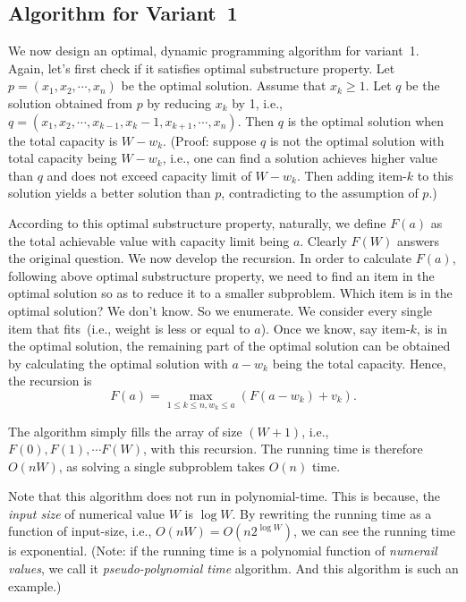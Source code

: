 \documentclass[letterpaper,11pt]{article}
\theoremstyle{mytheorem}
\begin{document}
\subsection*{Algorithm for Variant~1}

We now design an optimal, dynamic programming algorithm for variant~1.
Again, let's first check if it satisfies optimal substructure property.
Let $p = (x_1, x_2, \cdots, x_n)$ be the optimal solution.
Assume that $x_k \ge 1$. Let $q$ be the solution obtained from $p$ by
reducing $x_k$ by 1, i.e., $q = (x_1, x_2, \cdots, x_{k-1}, x_k - 1, x_{k + 1}, \cdots, x_n)$.
Then $q$ is the optimal solution when the total capacity is $W - w_k$.
(Proof: suppose $q$ is not the optimal solution with total capacity being $W - w_k$,
i.e., one can find a solution achieves higher value than $q$ and does not exceed capacity limit of $W - w_k$.
Then adding item-$k$ to this solution yields a better solution than $p$, contradicting to the assumption of $p$.)

According to this optimal substructure property, naturally,
we define $F(a)$ as the total achievable value with capacity limit being $a$.
Clearly $F(W)$ answers the original question.
We now develop the recursion.
In order to calculate $F(a)$, following above optimal substructure property,
we need to find an item in the optimal solution so as to reduce it to a smaller subproblem.
Which item is in the optimal solution? We don't know. So we enumerate.
We consider every single item that fits~(i.e., weight is less or equal to $a$).
Once we know, say item-$k$, is in the optimal solution, the remaining part of the optimal
solution can be obtained by calculating the optimal solution with $a - w_k$ being the total capacity.
Hence, the recursion is
$$F(a) = \textstyle \max_{1\le k \le n, w_k \le a} (F(a-w_k) + v_k).$$

The algorithm simply fills the array of size $(W + 1)$, i.e., $F(0), F(1), \cdots F(W)$,
with this recursion. The running time is therefore $O(nW)$, as solving
a single subproblem takes $O(n)$ time.

Note that this algorithm does not run in polynomial-time.
This is because, the \emph{input size} of numerical value $W$ is $\log W$.
By rewriting the running time as a function of input-size, i.e.,
$O(nW) = O(n2^{\log W})$, we can see the running time is exponential.
(Note: if the running time is a polynomial function of \emph{numerail values}, we call it
\emph{pseudo-polynomial time} algorithm. And this algorithm is such an example.)
\end{document}

